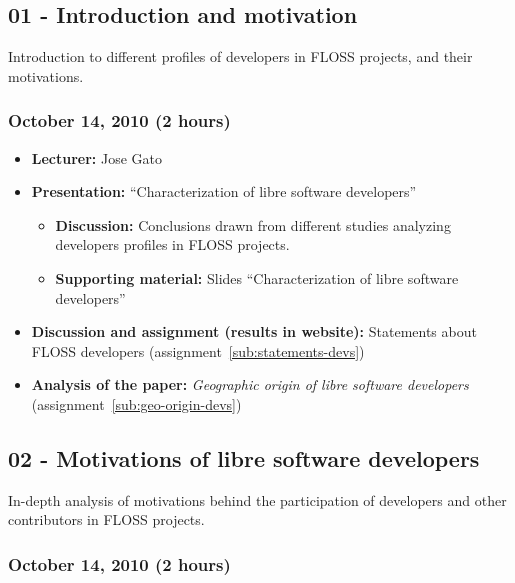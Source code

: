 \documentclass[a4paper]{article}
\begin{document}
\subsection{01 - Introduction and motivation}

Introduction to different profiles of developers in FLOSS projects, and their motivations.

\subsubsection{October 14, 2010 (2 hours)}

\begin{itemize}
\item \textbf{Lecturer:} Jose Gato
\item \textbf{Presentation:} ``Characterization of libre software developers''
  \begin{itemize}
  \item \textbf{Discussion:} Conclusions drawn from different studies analyzing developers profiles in FLOSS projects.
  \item \textbf{Supporting material:} Slides ``Characterization of libre software developers''
  \end{itemize}
\item \textbf{Discussion and assignment (results in website):} Statements about FLOSS developers (assignment~\ref{sub:statements-devs})
\item \textbf{Analysis of the paper:} \textit{Geographic origin of libre software developers} (assignment~\ref{sub:geo-origin-devs})
\end{itemize}

\subsection{02 - Motivations of libre software developers}

In-depth analysis of motivations behind the participation of developers and other contributors in FLOSS projects.

\subsubsection{October 14, 2010 (2 hours)}
\end{document}
